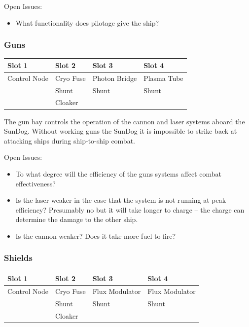 \begin{itemize}
Open Issues:
\begin{itemize}
\item What functionality does pilotage give the ship?
\end{itemize}

\subsubsection{Guns}

\begin{tabular}{ | p{2.5cm} | p{2.5cm} | p{2.5cm} | p{2.5cm} | }
\hline
Slot 1 & Slot 2 & Slot 3 & Slot 4 \\ \hline
Control Node & Cryo Fuse & Photon Bridge & Plasma Tube \\
& Shunt & Shunt & Shunt \\
& Cloaker & & \\
\hline
\end{tabular}

The gun bay controls the operation of the cannon and laser systems aboard
the SunDog.  Without working guns the SunDog it is impossible to strike
back at attacking ships during ship-to-ship combat.

Open Issues:
\begin{itemize}
\item To what degree will the efficiency of the guns systems affect
combat effectiveness?
\item Is the laser weaker in the case that the system is not running
at peak efficiency?  Presumably no but it will take longer to charge --
the charge can determine the damage to the other ship.
\item Is the cannon weaker?  Does it take more fuel to fire?
\end{itemize}

\subsubsection{Shields}

\begin{tabular}{ | p{2.5cm} | p{2.5cm} | p{2.5cm} | p{2.5cm} | }
\hline
Slot 1 & Slot 2 & Slot 3 & Slot 4 \\ \hline
Control Node & Cryo Fuse & Flux Modulator & Flux Modulator \\
& Shunt & Shunt & Shunt \\
& Cloaker & & \\
\hline
\end{tabular}


\end{itemize}
